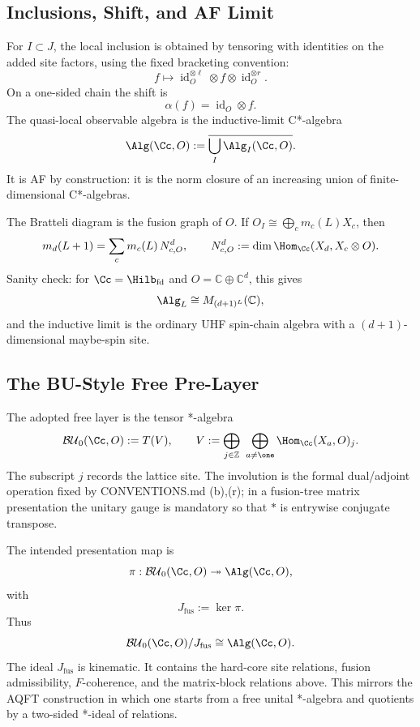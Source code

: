 \subsection{Inclusions, Shift, and AF Limit}

For \(I\subset J\), the local inclusion is obtained by tensoring with identities
on the added site factors, using the fixed bracketing convention:
\[
  f\longmapsto
  \operatorname{id}_{O}^{\otimes \ell}\otimes f\otimes
  \operatorname{id}_{O}^{\otimes r}.
\]
On a one-sided chain the shift is
\[
  \alpha(f)=\operatorname{id}_{O}\otimes f .
\]
The quasi-local observable algebra is the inductive-limit C*-algebra
\[
  \Alg(\Cc,O):=\overline{\bigcup_I \Alg_I(\Cc,O)}.
\]
It is AF by construction: it is the norm closure of an increasing union of
finite-dimensional C*-algebras.

The Bratteli diagram is the fusion graph of \(O\).  If
\(O_I\cong\bigoplus_c m_c(L)X_c\), then
\[
  m_d(L+1)=\sum_c m_c(L)\,N_{c,O}^{d},
  \qquad
  N_{c,O}^{d}:=\dim\Hom_{\Cc}(X_d,X_c\otimes O).
\]
Sanity check: for \(\Cc=\Hilb_{\mathrm{fd}}\) and
\(O=\mathbb C\oplus\mathbb C^d\), this gives
\[
  \Alg_L\cong M_{(d+1)^L}(\mathbb C),
\]
and the inductive limit is the ordinary UHF spin-chain algebra with a
\((d+1)\)-dimensional maybe-spin site.

\subsection{The BU-Style Free Pre-Layer}

The adopted free layer is the tensor *-algebra
\[
  \mathcal{BU}_0(\Cc,O):=T(V),
  \qquad
  V:=\bigoplus_{j\in\mathbb Z}\ \bigoplus_{a\neq\one}
      \Hom_{\Cc}(X_a,O)_j .
\]
The subscript \(j\) records the lattice site.  The involution is the formal
dual/adjoint operation fixed by CONVENTIONS.md (b),(r); in a fusion-tree matrix
presentation the unitary gauge is mandatory so that \(*\) is entrywise conjugate
transpose.

The intended presentation map is
\[
  \pi:\mathcal{BU}_0(\Cc,O)\twoheadrightarrow \Alg(\Cc,O),
\]
with
\[
  J_{\mathrm{fus}}:=\ker\pi .
\]
Thus
\[
  \mathcal{BU}_0(\Cc,O)/J_{\mathrm{fus}}
  \cong
  \Alg(\Cc,O).
\]
The ideal \(J_{\mathrm{fus}}\) is kinematic.  It contains the hard-core site
relations, fusion admissibility, \(F\)-coherence, and the matrix-block
relations above.  This mirrors the AQFT construction in which one starts from a
free unital *-algebra and quotients by a two-sided *-ideal of relations.

